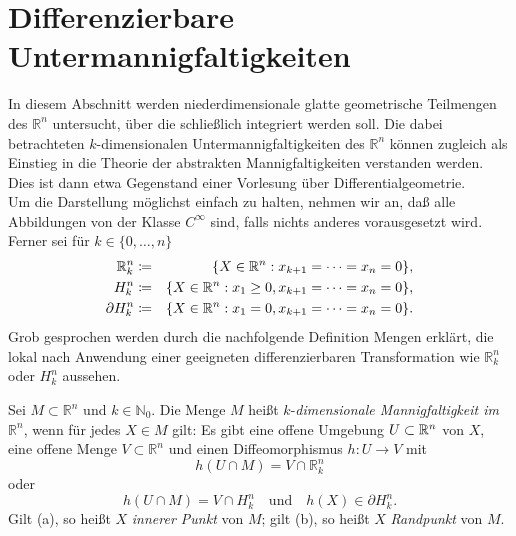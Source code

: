 \documentclass[a4paper,twoside,DIV15,BCOR12mm]{scrbook}
\begin{document}
\section{Differenzierbare Untermannigfaltigkeiten}


In diesem Abschnitt werden niederdimensionale glatte geometrische Teilmengen 
des ${\mathbb R}^{n}$ untersucht, über die schließlich integriert 
werden soll. Die dabei betrachteten $k$-dimensionalen 
Untermannigfaltigkeiten des ${\mathbb R}^{n}$ können zugleich als 
Einstieg in die Theorie der abstrakten Mannigfaltigkeiten verstanden werden. 
Dies ist dann etwa Gegenstand einer Vorlesung über Differentialgeometrie.\\

\noindent
Um die Darstellung möglichst einfach zu halten, nehmen wir an, daß 
alle Abbildungen von der Klasse $C^{\infty}$ sind, falls nichts 
anderes vorausgesetzt wird. Ferner sei für $k \in \{0,\dots,n\}$
\begin{eqnarray*}
{\mathbb R}^{n}_{k} & \da  & \{X \in {\mathbb R}^{n}: x_{k+1} = \dots = 
x_{n} = 0\}, \\
H_{k}^{n} & \da  & \{X \in {\mathbb R}^{n}: x_{1} \ge 0, x_{k+1} = 
\dots = x_{n} = 0\}, \\
\partial H^{n}_k & \da  & \{X \in {\mathbb R}^{n}:x_{1} = 0, x_{k+1} = 
\dots = x_{n} = 0\}.
\end{eqnarray*}
Grob gesprochen werden durch die nachfolgende Definition Mengen 
erklärt, die lokal nach Anwendung einer geeigneten differenzierbaren 
Transformation wie ${\mathbb R}_{k}^{n}$ oder $H_{k}^{n}$ aussehen.

\bigskip

 Sei $M \subset {\mathbb R}^{n}$ und $k 
\in {\mathbb N}_{0}$. Die Menge $M$ heißt $k$-{\em dimensionale 
Mannigfaltigkeit im} ${\mathbb R}^{n}$, 
wenn für jedes $X \in M$ 
gilt: Es gibt eine offene Umgebung $U\subset \mathbb{R}^n$ von $X$, eine offene Menge $V 
\subset {\mathbb R}^{n}$ und einen Diffeomorphismus $h: U \to V$ mit
\begin{equation}
 h(U \cap M) = V \cap {\mathbb R}_{k}^{n}\tag{a}
\end{equation}
oder
\begin{equation}
h(U \cap M) = V \cap H_{k}^{n}\quad\text{und}\quad h(X)\in\partial H^n_k.\tag{b}
\end{equation}
Gilt (a), so heißt $X$ {\em innerer Punkt} von $M$; gilt (b), so 
heißt $X$ {\em Randpunkt} von $M$.
\end{document}
